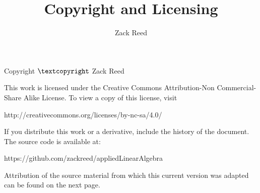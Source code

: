 \documentclass{ximera}
\author{Zack Reed}
\title{Copyright and Licensing}
\begin{document}
\begin{abstract}

\end{abstract}
\maketitle

Copyright $\textcopyright$ Zack Reed

This work is licensed under the Creative Commons Attribution-Non Commercial-Share Alike License. To view a copy of this license,
visit 

http://creativecommons.org/licenses/by-nc-sa/4.0/

If you distribute this work or a derivative, include the history of the document. The source code is available at: 

https://github.com/zackreed/appliedLinearAlgebra

Attribution of the source material from which this current version was adapted can be found on the next page.
\end{document}
